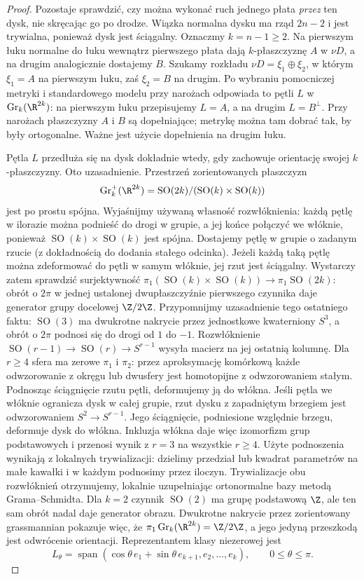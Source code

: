 \begin{proof}
Pozostaje sprawdzić, czy można wykonać
ruch jednego płata \emph{przez} ten dysk,
nie skręcając go po drodze. Wiązka
normalna dysku ma rząd $2n-2$ i jest
trywialna, ponieważ dysk jest ściągalny.
Oznaczmy $k=n-1\geq2$. Na pierwszym łuku normalne
do łuku wewnątrz pierwszego płata dają $k$-płaszczyznę
$A$ w $\nu D$, a na drugim analogicznie dostajemy $B$.
Szukamy rozkładu $\nu D=\xi_1\oplus\xi_2$, w którym
$\xi_1=A$ na pierwszym łuku, zaś $\xi_2=B$ na drugim.
Po wybraniu pomocniczej metryki i standardowego modelu
przy narożach odpowiada to pętli $L$ w
$\operatorname{Gr}_k(\R^{2k})$: na pierwszym łuku
przepisujemy $L=A$, a na drugim $L=B^\perp$.
Przy narożach płaszczyzny $A$ i $B$ są dopełniające;
metrykę można tam dobrać tak, by były ortogonalne.
Ważne jest użycie dopełnienia na drugim łuku.

Pętla $L$ przedłuża się na dysk dokładnie wtedy,
gdy zachowuje orientację swojej $k$-płaszczyzny.
Oto uzasadnienie. Przestrzeń zorientowanych płaszczyzn
\[
 \operatorname{Gr}^+_k(\R^{2k})
 =\operatorname{SO}(2k)/(\operatorname{SO}(k)\times
                         \operatorname{SO}(k))
\]
jest po prostu spójna. Wyjaśnijmy używaną własność
rozwłóknienia: każdą pętlę w ilorazie można podnieść do
drogi w grupie, a jej końce połączyć we włóknie,
ponieważ $\operatorname{SO}(k)\times\operatorname{SO}(k)$
jest spójna. Dostajemy pętlę w grupie o zadanym rzucie
(z dokładnością do dodania stałego odcinka).
Jeżeli każdą taką pętlę można zdeformować do pętli
w samym włóknie, jej rzut jest ściągalny.
Wystarczy zatem sprawdzić surjektywność
$\pi_1(\operatorname{SO}(k)\times\operatorname{SO}(k))
\to\pi_1\operatorname{SO}(2k)$: obrót o $2\pi$
w jednej ustalonej dwupłaszczyźnie pierwszego czynnika
daje generator grupy docelowej $\Z/2\Z$.
Przypomnijmy uzasadnienie tego ostatniego faktu:
$\operatorname{SO}(3)$ ma dwukrotne nakrycie przez
jednostkowe kwaterniony $S^3$, a obrót o $2\pi$
podnosi się do drogi od $1$ do $-1$.
Rozwłóknienie $\operatorname{SO}(r-1)\to\operatorname{SO}(r)
\to S^{r-1}$ wysyła macierz na jej ostatnią kolumnę.
Dla $r\geq4$ sfera ma zerowe $\pi_1$ i $\pi_2$:
przez aproksymację komórkową każde odwzorowanie z okręgu
lub dwusfery jest homotopijne z odwzorowaniem stałym.
Podnosząc ściągnięcie rzutu pętli, deformujemy ją
do włókna. Jeśli pętla we włóknie ogranicza dysk
w całej grupie, rzut dysku z zapadniętym brzegiem
jest odwzorowaniem $S^2\to S^{r-1}$. Jego ściągnięcie, podniesione
względnie brzegu, deformuje dysk do włókna.
Inkluzja włókna daje więc izomorfizm grup podstawowych
i przenosi wynik z $r=3$ na wszystkie $r\geq4$.
Użyte podnoszenia wynikają z lokalnych trywializacji:
dzielimy przedział lub kwadrat parametrów na małe
kawałki i w każdym podnosimy przez iloczyn.
Trywializacje obu rozwłóknień otrzymujemy, lokalnie
uzupełniając ortonormalne bazy metodą Grama--Schmidta.
Dla $k=2$ czynnik
$\operatorname{SO}(2)$ ma grupę podstawową $\Z$,
ale ten sam obrót nadal daje generator obrazu.
Dwukrotne nakrycie przez zorientowany grassmannian
pokazuje więc, że $\pi_1\operatorname{Gr}_k(\R^{2k})
=\Z/2\Z$, a jego jedyną przeszkodą jest odwrócenie
orientacji. Reprezentantem klasy niezerowej jest
\[
 L_\theta=\operatorname{span}
 (\cos\theta\,e_1+\sin\theta\,e_{k+1},e_2,\ldots,e_k),
 \qquad 0\leq\theta\leq\pi.
\]


\end{proof}
